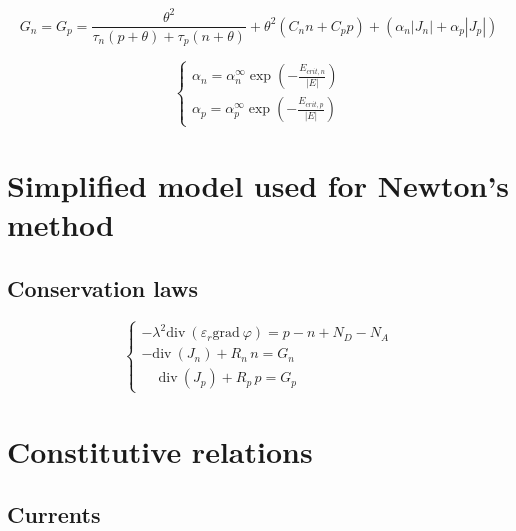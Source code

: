 \documentclass[9pt]{amsart}
\begin{document}
\begin{equation}\label{eq:generation}
G_{n} = G_{p} = 
\displaystyle 
\frac{\theta^{2}}{\tau_{n} (p + \theta) + \tau_{p} (n + \theta)}
+ \theta^{2} \left(C_{n} n + C_{p} p \right)
+ \left(\alpha_{n} |J_{n}|+ \alpha_{p} |J_{p}| \right)
\end{equation}


\begin{equation}\label{eq:ioniz_coeff}
\left\{
\begin{array}{ll}
\alpha_{n} = \displaystyle 
\alpha_{n}^{\infty} \exp \left( -\frac{E_{crit,n}}{|E|} \right)
\\[5mm]
\alpha_{p} = \displaystyle 
\alpha_{p}^{\infty} \exp \left( -\frac{E_{crit,p}}{|E|} \right)
\end{array}
\right.
\end{equation}

\newpage

\section{Simplified model used for Newton's method}
\subsection{Conservation laws}

\begin{equation}\label{eq:conservationN}
\left\{
\begin{array}{ll}
-\lambda^{2}\mathrm{div}\ \left(\varepsilon_{r} 
\mathrm{grad}\ \varphi \right) = p - n + N_{D} - N_{A} \\[5mm]
-\mathrm{div}\ \left(J_{n} \right) + R_{n} \, n = G_{n} \\[5mm]
\phantom{-}\mathrm{div}\ \left(J_{p} \right) + R_{p} \, p = G_{p}
\end{array}
\right.
\end{equation}

\section{Constitutive relations}

\subsection{Currents}
\end{document}
